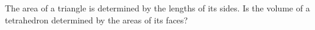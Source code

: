 The area of a triangle is determined by the lengths of its sides. Is the volume of a tetrahedron determined by the areas of its faces?